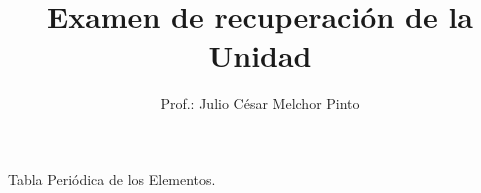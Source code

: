 \documentclass[12pt,addpoints]{evalua}
\title{Examen de {\color{brown}recuperación} de la Unidad}
\author{Prof.: Julio César Melchor Pinto}
\begin{document}
%
\begin{questions}
   \question[5]{}
   
   \newpage

   \question[5]{\footnotesize}

    \begin{multicols}{2}

        \question[5]{}

        \question[5]{}
    \end{multicols}
    
    \begin{multicols}{2}
\question[5]{}

\question[5]{}
    \end{multicols}
    
    \begin{multicols}{2}
        \question[5]{}
        \question[5]{}
    \end{multicols}
\question[6]{}

\question[10]{}

\question[10]{}

\newpage

    \begin{multicols}{2}
\question[15]{}
\question[15]{}
    \end{multicols}
\question[4]{}
\end{questions}
\begin{landscape}
    \begin{minipage}[b]{\textwidth}
        \thispagestyle{foot}
        \begin{table}[H]
            \centering
            \caption{Tabla Peri\'odica de los Elementos.}
            \TablaPeriodica[0.48]
            \label{tab:periodic_table}
        \end{table}
    \end{minipage}
\end{landscape}
\end{document}
